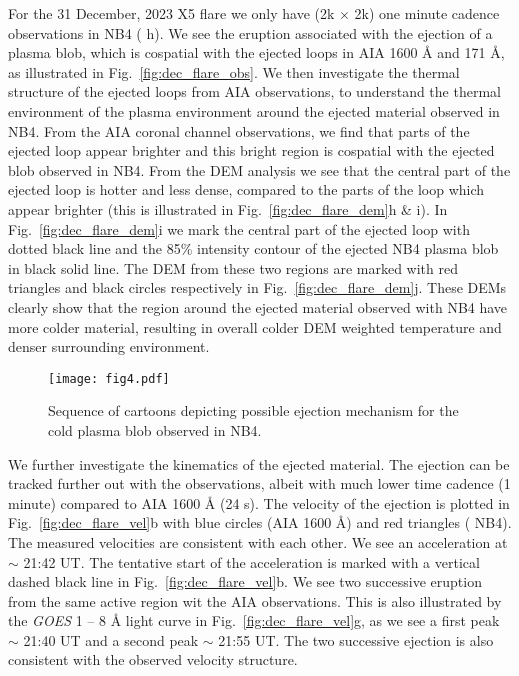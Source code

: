 For the 31 December, 2023 X5 flare we only have (2k $\times$ 2k) one minute cadence observations in NB4 ( h). We see the eruption associated with the ejection of a plasma blob, which is cospatial with the ejected loops in AIA 1600 {\AA} and 171 {\AA}, as illustrated in Fig.~\ref{fig:dec_flare_obs}. We then investigate the thermal structure of the ejected loops from AIA observations, to understand the thermal environment of the plasma environment around the ejected material observed in NB4. From the AIA coronal channel observations, we find that parts of the ejected loop appear brighter and this bright region is cospatial with the ejected blob observed in NB4. From the DEM analysis we see that the central part of the ejected loop is hotter and less dense, compared to the parts of the loop which appear brighter (this is illustrated in Fig.~\ref{fig:dec_flare_dem}h \& i). In Fig.~\ref{fig:dec_flare_dem}i we mark the central part of the ejected loop with dotted black line and the 85\% intensity contour of the ejected NB4 plasma blob in black solid line. The DEM from these two regions are marked with red triangles and black circles respectively in Fig.~\ref{fig:dec_flare_dem}j. These DEMs clearly show that the region around the ejected material observed with NB4 have more colder material, resulting in overall colder DEM weighted temperature and denser surrounding environment.

\begin{wrapfigure}{l}{0.45\textwidth}
    \centering
    \texttt{[image: fig4.pdf]}
    \caption{Sequence of cartoons depicting possible ejection mechanism for the cold plasma blob observed in {\suit} NB4.}
    \label{fig:cart}
\end{wrapfigure}

We further investigate the kinematics of the ejected material. The ejection can be tracked further out with the {\suit} observations, albeit with much lower time cadence (1 minute) compared to AIA 1600 {\AA} (24 s). The velocity of the ejection is plotted in Fig.~\ref{fig:dec_flare_vel}b with blue circles (AIA 1600 {\AA}) and red triangles ({\suit} NB4). The measured velocities are consistent with each other. We see an acceleration at $\sim$ 21:42 UT. The tentative start of the acceleration is marked with a vertical dashed black line in Fig.~\ref{fig:dec_flare_vel}b. We see two successive eruption from the same active region wit the AIA observations. This is also illustrated by the {\it GOES} 1 {--} 8 {\AA} light curve in Fig.~\ref{fig:dec_flare_vel}g, as we see a first peak $\sim$ 21:40 UT and a second peak $\sim$ 21:55 UT. The two successive ejection is also consistent with the observed velocity structure. 

